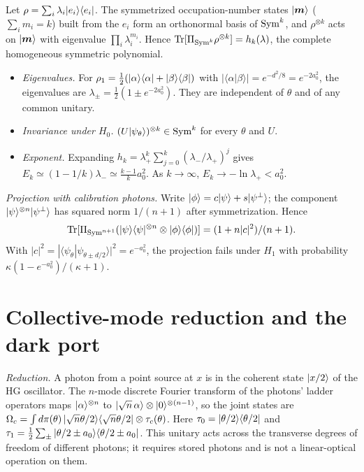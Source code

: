Let $\rho=\sum_i\lambda_i|e_i\rangle\langle e_i|$. The symmetrized occupation-number states $|\bm m\rangle$ ($\sum_im_i=k$)
built from the $e_i$ form an orthonormal basis of $\mathrm{Sym}^k$, and $\rho^{\otimes k}$ acts on $|\bm m\rangle$ with
eigenvalue $\prod_i\lambda_i^{m_i}$. Hence $\mathrm{Tr}[\Pi_{\mathrm{Sym}^k}\rho^{\otimes k}]=h_k(\lambda)$, the complete
homogeneous symmetric polynomial.
\begin{itemize}
\item \emph{Eigenvalues.} For $\rho_1=\tfrac12(|\alpha\rangle\langle \alpha|+|\beta\rangle\langle \beta|)$ with
  $|\langle\alpha|\beta\rangle|=e^{-d^2/8}=e^{-2a_0^2}$, the eigenvalues are $\lambda_\pm=\tfrac12(1\pm e^{-2a_0^2})$.
  They are independent of $\theta$ and of any common unitary.
\item \emph{Invariance under $H_0$.} $(U|\psi_\theta\rangle)^{\otimes k}\in\mathrm{Sym}^k$ for every $\theta$ and $U$.
\item \emph{Exponent.} Expanding $h_k=\lambda_+^k\sum_{j=0}^k(\lambda_-/\lambda_+)^j$ gives
  $E_k\simeq(1-1/k)\lambda_-\simeq\tfrac{k-1}{k}a_0^2$. As $k\to\infty$, $E_k\to-\ln\lambda_+<a_0^2$.
\end{itemize}

\emph{Projection with calibration photons.} Write $|\phi\rangle=c|\psi\rangle+s|\psi^\perp\rangle$; the component
$|\psi\rangle^{\otimes n}|\psi^\perp\rangle$ has squared norm $1/(n+1)$ after symmetrization. Hence
\begin{equation}
\mathrm{Tr}[\Pi_{\mathrm{Sym}^{n+1}}(|\psi\rangle\langle \psi|^{\otimes n}\otimes|\phi\rangle\langle \phi|)]=(1+n|c|^2)/(n+1).
\end{equation}
With $|c|^2=|\langle\psi_\theta|\psi_{\theta\pm d/2}\rangle|^2=e^{-a_0^2}$, the projection fails under $H_1$ with
probability $\kappa(1-e^{-a_0^2})/(\kappa+1)$.

\section{Collective-mode reduction and the dark port}
\label{app:collective}

\emph{Reduction.} A photon from a point source at $x$ is in the coherent state $|x/2\rangle$ of the HG oscillator. The
$n$-mode discrete Fourier transform of the photons' ladder operators maps $|\alpha\rangle^{\otimes n}$ to
$|\sqrt n\,\alpha\rangle\otimes|0\rangle^{\otimes(n-1)}$, so the joint states are
$\Omega_c=\int d\pi(\theta)\,|\sqrt n\theta/2\rangle\langle \sqrt n\theta/2|\otimes\tau_c(\theta)$. Here
$\tau_0=|\theta/2\rangle\langle \theta/2|$ and $\tau_1=\tfrac12\sum_\pm|\theta/2\pm a_0\rangle\langle \theta/2\pm a_0|$. This
unitary acts across the transverse degrees of freedom of different photons; it requires stored photons and is not a
linear-optical operation on them.

